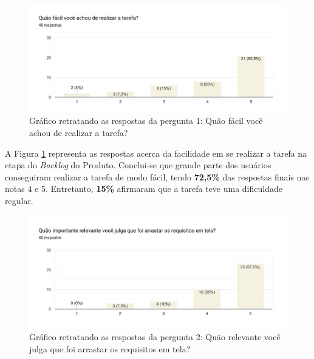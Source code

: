 \begin{figure}[H]
    \begin{center}
        \caption{{Gráfico retratando as respostas da pergunta 1: Quão fácil você achou de realizar a tarefa?}}
        \label{fig:backlog_respostas_1}
        \includegraphics[scale=0.65]{figuras/questionario/backlog-1.png}
    \end{center}
\end{figure}

A Figura \ref{fig:backlog_respostas_1} representa as respostas acerca da facilidade em se realizar a tarefa na etapa do \textit{Backlog} do Produto. Conclui-se que grande parte dos usuários conseguiram realizar a tarefa de modo fácil, tendo \textbf{72,5\%} das respostas finais nas notas 4 e 5. Entretanto, \textbf{15\%} afirmaram que a tarefa teve uma dificuldade regular.

\begin{figure}[H]
    \begin{center}
        \caption{{Gráfico retratando as respostas da pergunta 2: Quão relevante você julga que foi arrastar os requisitos em tela?}}
        \label{fig:backlog_respostas_2}
        \includegraphics[scale=0.65]{figuras/questionario/backlog-2.png}
    \end{center}
\end{figure}

